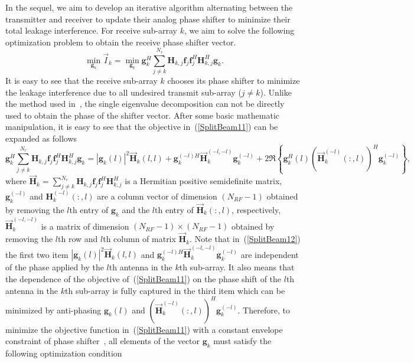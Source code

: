 \documentclass[11pt,draftcls,onecolumn]{IEEEtran}
\begin{document}
In the sequel, we aim to develop an iterative algorithm alternating between the transmitter and receiver to update their analog phase shifter to minimize their total leakage interference. For receive sub-array $k$, we aim to solve the following optimization problem to obtain the receive phase shifter vector.
\begin{equation}\label{SplitBeam11}
\min_{\bm{g}_{k}}\overrightarrow{I}_{k}=\min_{\bm{g}_{k}}\bm{g}_{k}^{H}
\sum_{j\neq k}^{N_{r}}\bm{H}_{k,j}\bm{f}_{j}\bm{f}_{j}^{H}\bm{H}_{k,j}^{H}
\bm{g}_{k}.
\end{equation}
It is easy to see that the receive sub-array $k$ chooses its phase shifter to minimize the leakage interference due to all undesired
transmit sub-array ($j\neq k$). Unlike the method used in~\cite{TITGoma2011}, the single eigenvalue decomposition can not be directly used to obtain the phase of the shifter vector. After some basic mathematic manipulation, it is easy to see that the objective in~(\ref{SplitBeam11}) can be expanded as follows
\begin{equation}\label{SplitBeam12}
\bm{g}_{k}^{H}
\sum_{j\neq k}^{N_{r}}\bm{H}_{k,j}\bm{f}_{j}\bm{f}_{j}^{H}\bm{H}_{k,j}^{H}\bm{g}_{k}=
\left|\bm{g}_{k}\left(l\right)\right|^{2}\overrightarrow{\bm{H}}_{k}\left(l,l\right)+\bm{g}_{k}^{\left(-l\right)H}
\overrightarrow{\bm{H}}_{k}^{\left(-l,-l\right)}\bm{g}_{k}^{\left(-l\right)}+2\Re\left\{\bm{g}_{k}^{H}
\left(l\right)\left(\overrightarrow{\bm{H}}_{k}^{\left(-l\right)}\left(:,l\right)\right)^{H}\bm{g}_{k}^{\left(-l\right)}\right\},
\end{equation}
where $\overrightarrow{\bm{H}}_{k}=\sum\limits_{j\neq k}^{N_{r}}\bm{H}_{k,j}\bm{f}_{j}\bm{f}_{j}^{H}\bm{H}_{k,j}^{H}$ is a Hermitian positive semidefinite matrix,
$\bm{g}_{k}^{\left(-l\right)}$ and $\bm{H}_{k}^{\left(-l\right)}\left(:,l\right)$ are a column vector of dimension $\left(N_{RF}-1\right)$ obtained by removing the $l$th entry of $\bm{g}_{k}$ and the $l$th entry of $\overrightarrow{\bm{H}}_{k}\left(:,l\right)$, respectively, $\overrightarrow{\bm{H}}_{k}^{\left(-l,-l\right)}$ is a matrix of dimension $\left(N_{RF}-1\right)\times \left(N_{RF}-1\right)$ obtained by removing the $l$th row and $l$th column of matrix $\overrightarrow{\bm{H}}_{k}$. Note that in~(\ref{SplitBeam12}) the first two item $\left|\bm{g}_{k}\left(l\right)\right|^{2}\overrightarrow{\bm{H}}_{k}\left(l,l\right)$ and $\bm{g}_{k}^{\left(-l\right)H}\overrightarrow{\bm{H}}_{k}^{\left(-l,-l\right)}\bm{g}_{k}^{\left(-l\right)}$ are independent of the phase applied by the $l$th antenna in the $k$th sub-array. It also means that the dependence of the objective of~(\ref{SplitBeam11}) on the phase shift of the $l$th antenna in the $k$th sub-array is fully captured in the third item which can be minimized by anti-phasing $\bm{g}_{k}\left(l\right)$ and $\left(\overrightarrow{\bm{H}}_{k}^{\left(-l\right)}\left(:,l\right)\right)^{H}\bm{g}_{k}^{\left(-l\right)}$. Therefore, to minimize the objective function in~(\ref{SplitBeam11}) with a constant envelope constraint of phase shifter~\cite{TWCAyach2014,JSTSPAlk2014}, all elements of the vector $\bm{g}_{k}$ must satisfy the following optimization condition
\end{document}
